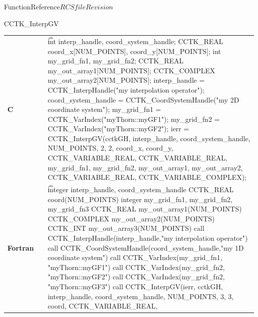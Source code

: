 \begin{cactuspart}{FunctionReference}{$RCSfile$}{$Revision$}
\begin{CCTKFunc}{CCTK\_InterpGV}
\begin{examples}
\begin{tabular}{@{}p{3cm}cp{11cm}}
\hfill {\bf C} && {\t
int interp\_handle, coord\_system\_handle;
CCTK\_REAL coord\_x[NUM\_POINTS], coord\_y[NUM\_POINTS];
int my\_grid\_fn1,  my\_grid\_fn2;
CCTK\_REAL my\_out\_array1[NUM\_POINTS];
CCTK\_COMPLEX  my\_out\_array2[NUM\_POINTS];\linebreak
interp\_handle =\vfill
\hspace{2ex} CCTK\_InterpHandle("my interpolation operator");
coord\_system\_handle =\vfill
\hspace{2ex} CCTK\_CoordSystemHandle("my 2D coordinate system");
my\_grid\_fn1 = CCTK\_VarIndex("myThorn::myGF1");
my\_grid\_fn2 = CCTK\_VarIndex("myThorn::myGF2");\linebreak
ierr = CCTK\_InterpGV(cctkGH,\vfill
\hspace{2ex} interp\_handle, coord\_system\_handle,\vfill
\hspace{2ex} NUM\_POINTS, 2, 2,\vfill
\hspace{2ex} coord\_x, coord\_y,\vfill
\hspace{2ex} CCTK\_VARIABLE\_REAL, CCTK\_VARIABLE\_REAL,\vfill
\hspace{2ex} my\_grid\_fn1,  my\_grid\_fn2,\vfill
\hspace{2ex} my\_out\_array1, my\_out\_array2,\vfill
\hspace{2ex} CCTK\_VARIABLE\_REAL, CCTK\_VARIABLE\_COMPLEX);
}
\\
\hfill {\bf Fortran} && {\t
integer interp\_handle, coord\_system\_handle
CCTK\_REAL coord(NUM\_POINTS)
integer my\_grid\_fn1,  my\_grid\_fn2, my\_grid\_fn3
CCTK\_REAL my\_out\_array1(NUM\_POINTS)
CCTK\_COMPLEX  my\_out\_array2(NUM\_POINTS)
CCTK\_INT my\_out\_array3(NUM\_POINTS)\linebreak
call CCTK\_InterpHandle(interp\_handle,\vfill\hspace{2ex}"my interpolation operator")
call CCTK\_CoordSystemHandle(coord\_system\_handle,\vfill\hspace{2ex}"my 1D coordinate system")
call CCTK\_VarIndex(my\_grid\_fn1, "myThorn::myGF1")
call CCTK\_VarIndex(my\_grid\_fn2, "myThorn::myGF2")
call CCTK\_VarIndex(my\_grid\_fn2, "myThorn::myGF3")\linebreak
call CCTK\_InterpGV(ierr, cctkGH,\vfill
\hspace{2ex} interp\_handle, coord\_system\_handle,\vfill
\hspace{2ex} NUM\_POINTS, 3, 3,\vfill
\hspace{2ex} coord,\vfill
\hspace{2ex} CCTK\_VARIABLE\_REAL,\vfill
}
\end{tabular}
\end{examples}
\end{CCTKFunc}
\end{cactuspart}
